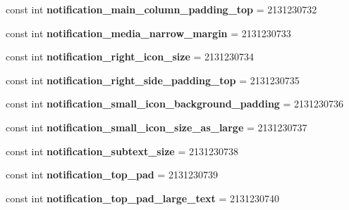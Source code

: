 \begin{DoxyCompactItemize}
const int {\bfseries notification\+\_\+main\+\_\+column\+\_\+padding\+\_\+top} = 2131230732
\item 
\mbox{\label{classst_delivery_1_1_resource_1_1_dimension_aa89f00644dc1780ceabe779cfd1e8329}} 
const int {\bfseries notification\+\_\+media\+\_\+narrow\+\_\+margin} = 2131230733
\item 
\mbox{\label{classst_delivery_1_1_resource_1_1_dimension_adf546d5c757d244d416b3a971cbac628}} 
const int {\bfseries notification\+\_\+right\+\_\+icon\+\_\+size} = 2131230734
\item 
\mbox{\label{classst_delivery_1_1_resource_1_1_dimension_a2b23d28dded4f0c019d9b5fd515f20a3}} 
const int {\bfseries notification\+\_\+right\+\_\+side\+\_\+padding\+\_\+top} = 2131230735
\item 
\mbox{\label{classst_delivery_1_1_resource_1_1_dimension_abbdf4725165d476898abcc41c278e633}} 
const int {\bfseries notification\+\_\+small\+\_\+icon\+\_\+background\+\_\+padding} = 2131230736
\item 
\mbox{\label{classst_delivery_1_1_resource_1_1_dimension_acacbcfa72ba61ed2c283376c25afd927}} 
const int {\bfseries notification\+\_\+small\+\_\+icon\+\_\+size\+\_\+as\+\_\+large} = 2131230737
\item 
\mbox{\label{classst_delivery_1_1_resource_1_1_dimension_a629c113835f3777838b9c02c80b099e7}} 
const int {\bfseries notification\+\_\+subtext\+\_\+size} = 2131230738
\item 
\mbox{\label{classst_delivery_1_1_resource_1_1_dimension_a9b4590ea27e12af55f577200b8185922}} 
const int {\bfseries notification\+\_\+top\+\_\+pad} = 2131230739
\item 
\mbox{\label{classst_delivery_1_1_resource_1_1_dimension_a070f63fb25d7383ffaeb19a550472a06}} 
const int {\bfseries notification\+\_\+top\+\_\+pad\+\_\+large\+\_\+text} = 2131230740

\end{DoxyCompactItemize}
